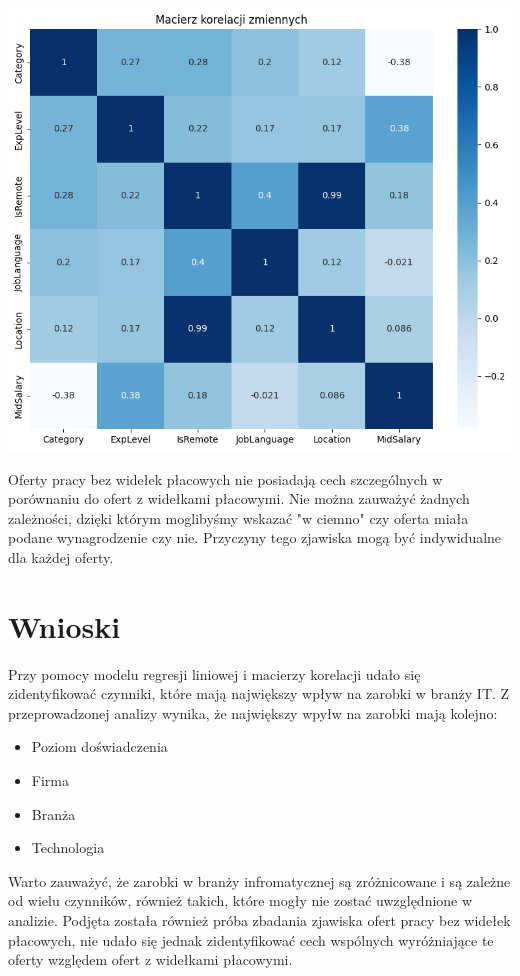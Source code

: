 \documentclass{article}
\begin{document}
\begin{center}
    \includegraphics[scale=0.5]{img/corr_matrix_zero_salary.png}
\end{center}

Oferty pracy bez widełek płacowych nie posiadają cech szczególnych w porównaniu do ofert z widełkami płacowymi.
Nie można zauważyć żadnych zależności, dzięki którym moglibyśmy wskazać "w ciemno" czy oferta miała podane wynagrodzenie czy nie.
Przyczyny tego zjawiska mogą być indywidualne dla każdej oferty.

\pagebreak

\section{Wnioski}

Przy pomocy modelu regresji liniowej i macierzy korelacji udało się zidentyfikować czynniki,
które mają największy wpływ na zarobki w branży IT.
Z przeprowadzonej analizy wynika, że największy wpyłw na zarobki mają kolejno:
\begin{itemize}
    \item Poziom doświadczenia
    \item Firma
    \item Branża
    \item Technologia
\end{itemize}

Warto zauważyć, że zarobki w branży infromatycznej są zróżnicowane i są zależne od wielu czynników, również takich,
które mogły nie zostać uwzględnione w analizie.
Podjęta została również próba zbadania zjawiska ofert pracy bez widełek płacowych, nie udało się jednak
zidentyfikować cech wspólnych wyróżniające te oferty względem ofert z widełkami płacowymi.
\end{document}
